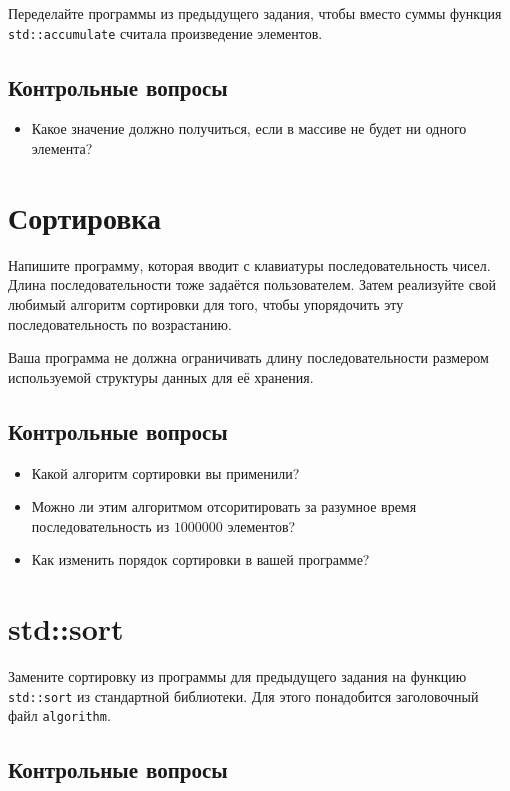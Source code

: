 \documentclass[10pt,twoside,openany]{book}
\begin{document}
Переделайте программы из предыдущего задания, чтобы вместо суммы функция {\tt std::accumulate} считала
произведение элементов.

\subsection*{Контрольные вопросы}

\begin{itemize}
    \item Какое значение должно получиться, если в массиве не будет ни одного элемента?
\end{itemize}

\section{Сортировка}

Напишите программу, которая вводит с клавиатуры последовательность чисел. Длина последовательности
тоже задаётся пользователем. Затем реализуйте свой любимый алгоритм сортировки для
того, чтобы упорядочить эту последовательность по возрастанию.

Ваша программа не должна ограничивать длину последовательности размером используемой
структуры данных для её хранения.

\subsection*{Контрольные вопросы}

\begin{itemize}
    \item Какой алгоритм сортировки вы применили?
    \item Можно ли этим алгоритмом отсоритировать за разумное время последовательность
          из $1000000$ элементов?
    \item Как изменить порядок сортировки в вашей программе?
\end{itemize}

\section{std::sort}

Замените сортировку из программы для предыдущего задания на функцию {\tt std::sort}
из стандартной библиотеки. Для этого понадобится заголовочный файл {\tt algorithm}.

\subsection*{Контрольные вопросы}
\end{document}
